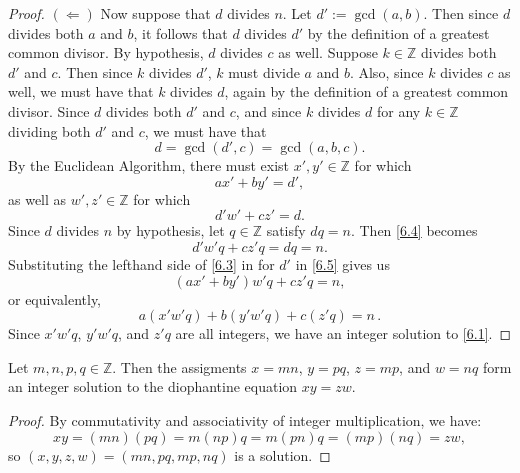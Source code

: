 \begin{problem}
\begin{proof}
$(\Longleftarrow)$ Now suppose that $d$ divides $n$. Let $d' := \gcd(a,b)$. Then since $d$ divides both $a$ and $b$, it follows that $d$ divides $d'$ by the definition of a greatest common divisor. By hypothesis, $d$ divides $c$ as well. Suppose $k \in \mathbb Z$ divides both $d'$ and $c$. Then since $k$ divides $d'$, $k$ must divide $a$ and $b$. Also, since $k$ divides $c$ as well, we must have that $k$ divides $d$, again by the definition of a greatest common divisor. Since $d$ divides both $d'$ and $c$, and since $k$ divides $d$ for any $k \in \mathbb Z$ dividing both $d'$ and $c$, we must have that
\begin{equation} \label{6.2}
d = \gcd(d',c) = \gcd(a,b,c).
\end{equation}
By the Euclidean Algorithm, there must exist $x', y' \in \mathbb Z$ for which
\begin{equation} \label{6.3}
ax' + by' = d',
\end{equation}
as well as $w',z' \in \mathbb Z$ for which 
\begin{equation} \label{6.4}
d'w' + cz' = d.
\end{equation}
Since $d$ divides $n$ by hypothesis, let $q \in \mathbb Z$ satisfy $dq = n$. Then \ref{6.4} becomes
\begin{equation} \label{6.5}
d'w'q + cz'q = dq = n.
\end{equation}
Substituting the lefthand side of \ref{6.3} in for $d'$ in \ref{6.5} gives us
\[
(ax' + by')w'q + cz'q = n,
\]
or equivalently, 
\[
\boxed{ a(x'w'q) + b(y'w'q) + c(z'q) = n } \,.
\]
Since $x'w'q$, $y'w'q$, and $z'q$ are all integers, we have an integer solution to \ref{6.1}.
\end{proof}

\begin{problem}[2] Let $m,n,p,q \in \mathbb Z$. Then the assigments $x=mn$, $y=pq$, $z=mp$, and $w=nq$ form an integer solution to the diophantine equation $xy=zw$. 
\end{problem}
\begin{proof} By commutativity and associativity of integer multiplication, we have: 
\[
xy = (mn)(pq) = m(np)q = m(pn)q = (mp)(nq) = zw,
\]
so $(x,y,z,w) = (mn,pq,mp,nq)$ is a solution. \end{proof}
\end{problem}

